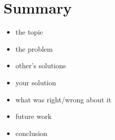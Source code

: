 \section{Summary} \label{sec:Summary}
\begin{itemize}
  \item
    the topic
  \item
    the problem
  \item
    other's solutions
  \item        
    your solution
  \item
    what was right/wrong about it
  \item
    future work
  \item
    conclusion 
\end{itemize}
